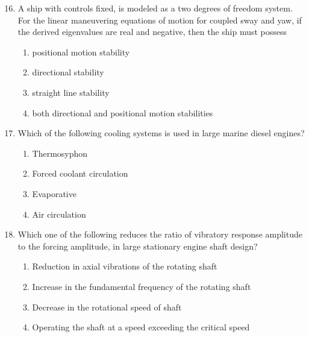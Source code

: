 \documentclass[journal]{IEEEtran}
\theoremstyle{remark}
\begin{document}
\newpage
\vspace*{0.25cm}

\begin{enumerate}[itemsep=1em]
\setcounter{enumi}{15}
\item A ship with controls fixed, is modeled as a two degrees of freedom system. For the linear maneuvering equations of motion for coupled sway and yaw, if the derived eigenvalues are real and negative, then the ship must possess 
\begin{enumerate}[label=\Alph*), leftmargin=2.5em, labelsep=0.5em, itemsep=0.5em]
      \item positional motion stability
      \item directional stability
      \item straight line stability
      \item both directional and positional motion stabilities
\end{enumerate}

\end{enumerate}

\begin{enumerate}[itemsep=1em]
\setcounter{enumi}{16}
\item Which of the following cooling systems is used in large marine diesel engines?
\begin{enumerate}[label=\Alph*), leftmargin=2.5em, labelsep=0.5em, itemsep=0.5em]
      \item Thermosyphon
      \item Forced coolant circulation
      \item Evaporative
      \item Air circulation
\end{enumerate}
\end{enumerate}

\begin{enumerate}[itemsep=1em]
\setcounter{enumi}{17}
\item Which one of the following reduces the ratio of vibratory response amplitude to the forcing amplitude, in large stationary engine shaft design?
\begin{enumerate}[label=\Alph*), leftmargin=2.5em, labelsep=0.5em, itemsep=0.5em]
      \item Reduction in axial vibrations of the rotating shaft 
      \item Increase in the fundamental frequency of the rotating shaft
      \item Decrease in the rotational speed of shaft  
      \item Operating the shaft at a speed exceeding the critical speed  
\end{enumerate}
\end{enumerate}
\end{document}
